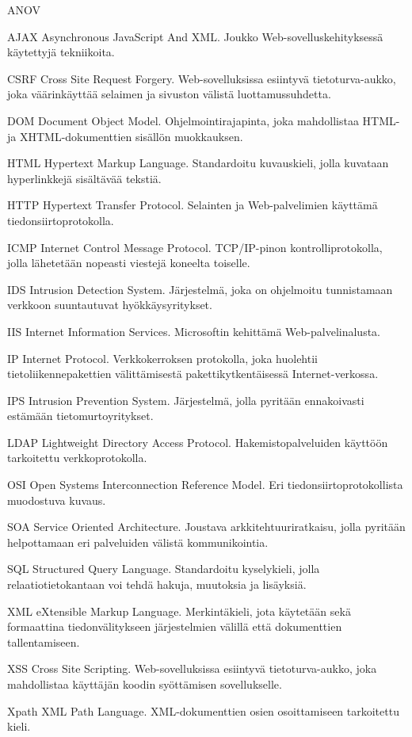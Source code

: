
\termlist

\begin{abbrlist}{ANOV}
\item[AJAX]	Asynchronous JavaScript And XML. Joukko Web-sovelluskehityksessä käytettyjä tekniikoita.
\item[CSRF]	Cross Site Request Forgery. Web-sovelluksissa esiintyvä tietoturva-aukko, joka väärinkäyttää selaimen ja sivuston välistä luottamussuhdetta.
\item[DOM]	Document Object Model. Ohjelmointirajapinta, joka mahdollistaa HTML- ja XHTML-dokumenttien sisällön muokkauksen.
\item[HTML]	Hypertext Markup Language. Standardoitu kuvauskieli, jolla kuvataan hyperlinkkejä sisältävää tekstiä.
\item[HTTP]     Hypertext Transfer Protocol. Selainten ja Web-palvelimien käyttämä tiedonsiirtoprotokolla.
\item[ICMP]	Internet Control Message Protocol. TCP/IP-pinon kontrolliprotokolla, jolla lähetetään nopeasti viestejä koneelta toiselle.
\item[IDS]	Intrusion Detection System. Järjestelmä, joka on ohjelmoitu tunnistamaan verkkoon suuntautuvat hyökkäysyritykset.
\item[IIS]      Internet Information Services. Microsoftin kehittämä Web-palvelinalusta.
\item[IP]	Internet Protocol. Verkkokerroksen protokolla, joka huolehtii tietoliikennepakettien välittämisestä pakettikytkentäisessä Internet-verkossa.
\item[IPS]	Intrusion Prevention System. Järjestelmä, jolla pyritään ennakoivasti estämään tietomurtoyritykset.
\item[LDAP]	Lightweight Directory Access Protocol. Hakemistopalveluiden käyttöön tarkoitettu verkkoprotokolla.
\item[OSI]	Open Systems Interconnection Reference Model. Eri tiedonsiirtoprotokollista muodostuva kuvaus.
\item[SOA]	Service Oriented Architecture. Joustava arkkitehtuuriratkaisu, jolla pyritään helpottamaan eri palveluiden välistä kommunikointia.
\item[SQL]	Structured Query Language. Standardoitu kyselykieli, jolla relaatiotietokantaan voi tehdä hakuja, muutoksia ja lisäyksiä.
\item[XML]	eXtensible Markup Language. Merkintäkieli, jota käytetään sekä formaattina tiedonvälitykseen järjestelmien välillä että dokumenttien tallentamiseen.
\item[XSS]	Cross Site Scripting. Web-sovelluksissa esiintyvä tietoturva-aukko, joka mahdollistaa käyttäjän koodin syöttämisen sovellukselle.  
\item[Xpath]    XML Path Language. XML-dokumenttien osien osoittamiseen tarkoitettu kieli.	
\end{abbrlist}
